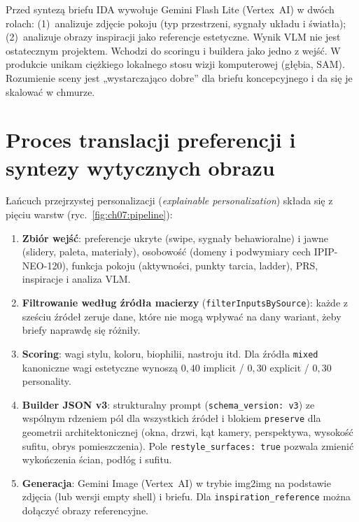 Przed syntezą briefu IDA wywołuje Gemini Flash Lite (Vertex~AI) w dwóch rolach: (1)~analizuje zdjęcie pokoju (typ przestrzeni, sygnały układu i światła); (2)~analizuje obrazy inspiracji jako referencje estetyczne. Wynik VLM nie jest ostatecznym projektem. Wchodzi do scoringu i buildera jako jedno z wejść.
W produkcie unikam ciężkiego lokalnego stosu wizji komputerowej (głębia, SAM). Rozumienie sceny jest „wystarczająco dobre” dla briefu koncepcyjnego i da się je skalować w chmurze.

\section{Proces translacji preferencji i syntezy wytycznych obrazu}
\label{ch07:sec:pipeline}

Łańcuch przejrzystej personalizacji (\emph{explainable personalization}) składa się z pięciu warstw (ryc.~\ref{fig:ch07:pipeline}):

\begin{enumerate}
  \item \textbf{Zbiór wejść}: preferencje ukryte (swipe, sygnały behawioralne) i jawne (slidery, paleta, materiały), osobowość (domeny i podwymiary cech IPIP-NEO-120), funkcja pokoju (aktywności, punkty tarcia, ladder), PRS, inspiracje i analiza VLM.
  \item \textbf{Filtrowanie według źródła macierzy} (\texttt{filterInputsBySource}): każde z sześciu źródeł zeruje dane, które nie mogą wpływać na dany wariant, żeby briefy naprawdę się różniły.
  \item \textbf{Scoring}: wagi stylu, koloru, biophilii, nastroju itd. Dla źródła \texttt{mixed} kanoniczne wagi estetyczne wynoszą $0{,}40$ implicit / $0{,}30$ explicit / $0{,}30$ personality.
  \item \textbf{Builder JSON v3}: strukturalny prompt (\texttt{schema\_version: v3}) ze wspólnym rdzeniem pól dla wszystkich źródeł i blokiem \texttt{preserve} dla geometrii architektonicznej (okna, drzwi, kąt kamery, perspektywa, wysokość sufitu, obrys pomieszczenia). Pole \texttt{restyle\_surfaces: true} pozwala zmienić wykończenia ścian, podłóg i sufitu.
  \item \textbf{Generacja}: Gemini Image (Vertex~AI) w trybie img2img na podstawie zdjęcia (lub wersji empty shell) i briefu. Dla \texttt{inspiration\_reference} można dołączyć obrazy referencyjne.
\end{enumerate}

